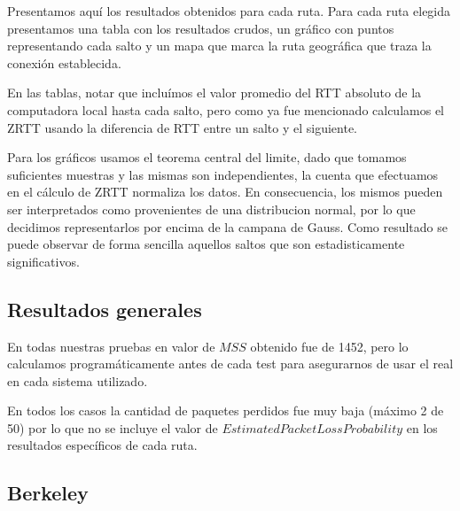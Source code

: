 Presentamos aquí los resultados obtenidos para cada ruta.
Para cada ruta elegida presentamos una tabla con los resultados crudos, un gráfico con puntos representando cada salto y un mapa que marca la ruta geográfica que traza la conexión establecida.

En las tablas, notar que incluímos el valor promedio del RTT absoluto de la computadora local hasta cada salto, pero como ya fue mencionado calculamos el ZRTT usando la diferencia de RTT entre un salto y el siguiente.

Para los gráficos usamos el teorema central del limite, dado que tomamos suficientes muestras y las mismas son independientes, la cuenta que efectuamos en el cálculo de ZRTT normaliza los datos. En consecuencia, los mismos pueden ser interpretados como provenientes de una distribucion normal, por lo que decidimos representarlos por encima de la campana de Gauss. Como resultado se puede observar de forma sencilla aquellos saltos que son estadisticamente significativos.

\subsection{Resultados generales}
 En todas nuestras pruebas en valor de $MSS$ obtenido fue de 1452, pero lo calculamos programáticamente antes de cada test para asegurarnos de usar el real en cada sistema utilizado.

 En todos los casos la cantidad de paquetes perdidos fue muy baja (máximo 2 de 50) por lo que no se incluye el valor de $EstimatedPacketLossProbability$ en los resultados específicos de cada ruta.

\subsection{Berkeley}

